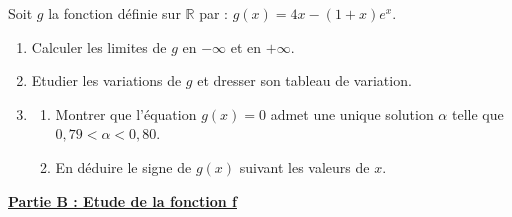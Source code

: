 \documentclass[12pt,a4paper]{article}
\begin{document}
\noindent Soit $g$ la fonction définie sur $\mathbb{R}$ par : $g(x) = 4x - (1 + x)e^x$.
\begin{enumerate}
    \item Calculer les limites de $g$ en $-\infty$ et en $+\infty$.
    \item Etudier les variations de $g$ et dresser son tableau de variation.
    \item 
    \begin{enumerate}
        \item Montrer que l'équation $g(x) = 0$ admet une unique solution $\alpha$ telle que $0,79 < \alpha < 0,80$.
        \item En déduire le signe de $g(x)$ suivant les valeurs de $x$.
    \end{enumerate}
\end{enumerate}

\vspace{0.5cm}

\noindent \underline{\textbf{Partie B : Etude de la fonction f}} \\
\end{document}
